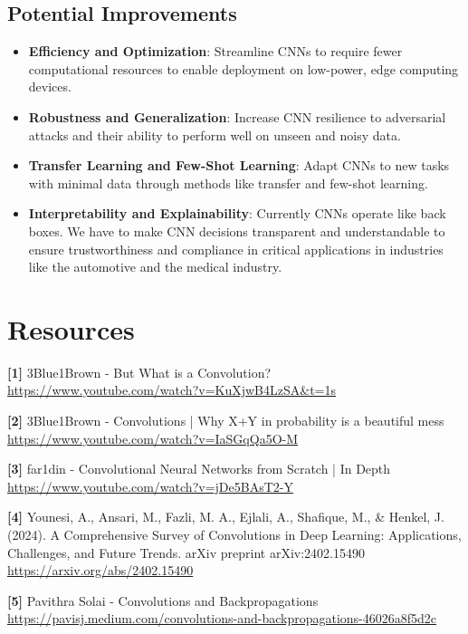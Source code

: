 \documentclass{article}
\begin{document}
    \subsection{Potential Improvements}
        \begin{itemize}
            \item \textbf{Efficiency and Optimization}: Streamline CNNs to require fewer computational resources to enable deployment on low-power, edge computing devices.
            \item \textbf{Robustness and Generalization}: Increase CNN resilience to adversarial attacks and their ability to perform well on unseen and noisy data.
            \item \textbf{Transfer Learning and Few-Shot Learning}: Adapt CNNs to new tasks with minimal data through methods like transfer and few-shot learning.
            \item \textbf{Interpretability and Explainability}: Currently CNNs operate like back boxes. We have to make CNN decisions transparent and understandable to ensure trustworthiness and compliance in critical applications in industries like the automotive and the medical industry.
        \end{itemize}
    
\section{Resources}
    \textbf{[1]} 3Blue1Brown - But What is a Convolution? \\
    \url{https://www.youtube.com/watch?v=KuXjwB4LzSA&t=1s}
    
    \textbf{[2]} 3Blue1Brown - Convolutions | Why X+Y in probability is a beautiful mess \\
    \url{https://www.youtube.com/watch?v=IaSGqQa5O-M}
    
    \textbf{[3]} far1din - Convolutional Neural Networks from Scratch | In Depth \\
    \url{https://www.youtube.com/watch?v=jDe5BAsT2-Y}
    
    \textbf{[4]} Younesi, A., Ansari, M., Fazli, M. A., Ejlali, A., Shafique, M., \& Henkel, J. (2024). A Comprehensive Survey of Convolutions in Deep Learning: Applications, Challenges, and Future Trends. arXiv preprint arXiv:2402.15490 \\
    \url{https://arxiv.org/abs/2402.15490}

    \textbf{[5]} Pavithra Solai - Convolutions and Backpropagations \\
    \url{https://pavisj.medium.com/convolutions-and-backpropagations-46026a8f5d2c}
\end{document}
